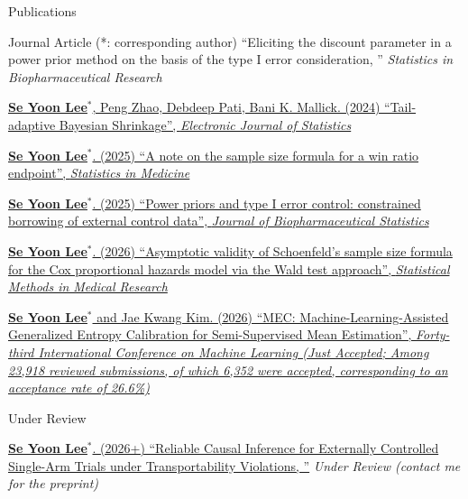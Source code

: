 \documentclass[
	11pt, %
]{resume} %
\begin{document}
\begin{rSection}{Publications}
\begin{rSubsection}{Journal Article (*: corresponding author)}{}{}{}
{``Eliciting the discount parameter in a power prior method on the basis of the type I error	consideration, ''} \textit{Statistics in Biopharmaceutical Research}
\item[] [13]
\href{https://projecteuclid.org/journals/electronic-journal-of-statistics/volume-18/issue-2/Tail-adaptive-Bayesian-shrinkage/10.1214/24-EJS2317.full}
{\underline{\textbf{Se Yoon Lee}$^{*}$}, Peng Zhao, Debdeep Pati, Bani K. Mallick. (2024) ``Tail-adaptive Bayesian Shrinkage'', \textit{Electronic Journal of Statistics}}
\item[] [14]
\href{https://onlinelibrary.wiley.com/doi/full/10.1002/sim.70165}
{\underline{\textbf{Se Yoon Lee}$^{*}$}. (2025) ``A note on the sample size formula for a win ratio endpoint'', \textit{Statistics in Medicine}}
\item[] [15]
\href{https://www.tandfonline.com/doi/abs/10.1080/10543406.2025.2575940}
{\underline{\textbf{Se Yoon Lee}$^{*}$}. (2025) ``Power priors and type I error control: constrained borrowing of external control data'', \textit{Journal of Biopharmaceutical Statistics}}
\item[] [16]
\href{https://journals.sagepub.com/doi/abs/10.1177/09622802261427024}
{\underline{\textbf{Se Yoon Lee}$^{*}$}. (2026) ``Asymptotic validity of Schoenfeld’s sample size formula for the Cox proportional hazards model via the Wald test approach'', \textit{Statistical Methods in Medical Research}}
\item[] [17]
\href{https://icml.cc/virtual/2026/poster/62031}
{\underline{\textbf{Se Yoon Lee}$^{*}$} and Jae Kwang Kim. (2026) ``MEC: Machine-Learning-Assisted Generalized Entropy Calibration for Semi-Supervised Mean Estimation'', \textit{Forty-third International Conference on Machine Learning (Just Accepted; Among 23,918 reviewed submissions, of which 6,352 were accepted, corresponding to an acceptance rate of 26.6\%)}}
\end{rSubsection}
\begin{rSubsection}{Under Review}{}{}{}
	\item[] [1]
	\href{}{\underline{\textbf{Se Yoon Lee}$^{*}$}. (2026+)
		``Reliable Causal Inference for Externally Controlled Single-Arm Trials under Transportability Violations, ''} \textit{Under Review (contact me for the preprint)}	
\end{rSubsection}


\end{rSection}
\end{document}
